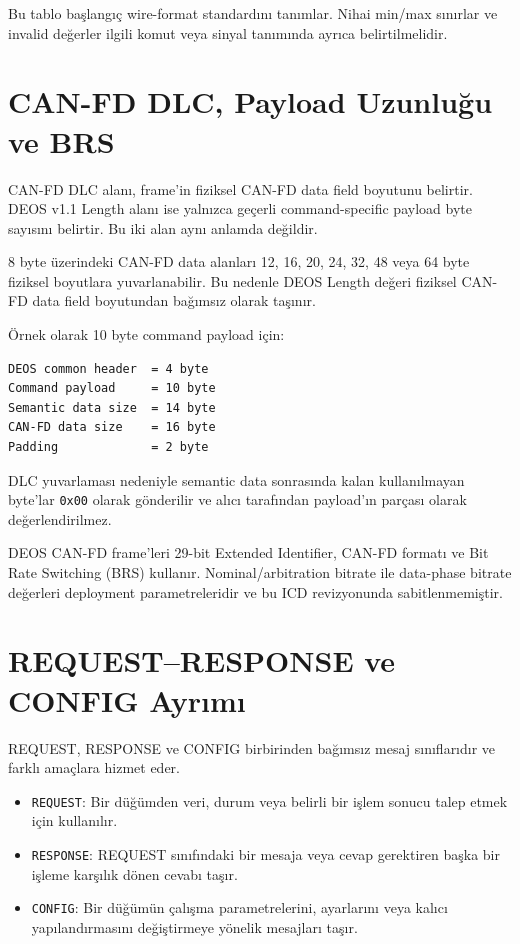 \documentclass[a4paper,10pt]{article}
\newcommand{\hex}[1]{\texttt{0x#1}}
\newcommand{\code}[1]{\texttt{#1}}
\begin{document}
Bu tablo başlangıç wire-format standardını tanımlar. Nihai min/max sınırlar ve
invalid değerler ilgili komut veya sinyal tanımında ayrıca belirtilmelidir.

\section{CAN-FD DLC, Payload Uzunluğu ve BRS}

CAN-FD DLC alanı, frame'in fiziksel CAN-FD data field boyutunu belirtir. DEOS v1.1
Length alanı ise yalnızca geçerli command-specific payload byte sayısını belirtir. Bu iki
alan aynı anlamda değildir.

8 byte üzerindeki CAN-FD data alanları 12, 16, 20, 24, 32, 48 veya 64 byte fiziksel
boyutlara yuvarlanabilir. Bu nedenle DEOS Length değeri fiziksel CAN-FD data field
boyutundan bağımsız olarak taşınır.

Örnek olarak 10 byte command payload için:

\begin{verbatim}
DEOS common header  = 4 byte
Command payload     = 10 byte
Semantic data size  = 14 byte
CAN-FD data size    = 16 byte
Padding             = 2 byte
\end{verbatim}

DLC yuvarlaması nedeniyle semantic data sonrasında kalan kullanılmayan byte'lar \hex{00}
olarak gönderilir ve alıcı tarafından payload'ın parçası olarak değerlendirilmez.

DEOS CAN-FD frame'leri 29-bit Extended Identifier, CAN-FD formatı ve Bit Rate Switching
(BRS) kullanır. Nominal/arbitration bitrate ile data-phase bitrate değerleri deployment
parametreleridir ve bu ICD revizyonunda sabitlenmemiştir.

\section{REQUEST--RESPONSE ve CONFIG Ayrımı}

REQUEST, RESPONSE ve CONFIG birbirinden bağımsız mesaj sınıflarıdır ve farklı amaçlara hizmet eder.

\begin{itemize}
    \item \code{REQUEST}: Bir düğümden veri, durum veya belirli bir işlem sonucu talep etmek için kullanılır.
    \item \code{RESPONSE}: REQUEST sınıfındaki bir mesaja veya cevap gerektiren başka bir işleme karşılık dönen cevabı taşır.
    \item \code{CONFIG}: Bir düğümün çalışma parametrelerini, ayarlarını veya kalıcı yapılandırmasını değiştirmeye yönelik mesajları taşır.
\end{itemize}
\end{document}
